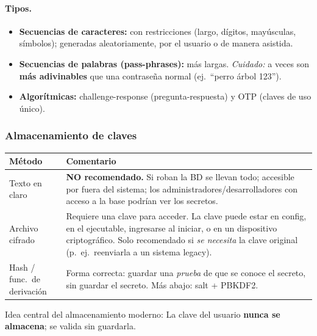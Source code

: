 \documentclass[../main.tex]{subfiles}
\begin{document}
\paragraph{Tipos.}
\begin{itemize}[itemsep=1pt]
  \item \textbf{Secuencias de caracteres:} con restricciones (largo, dígitos, mayúsculas, símbolos); generadas aleatoriamente, por el usuario o de manera asistida.
  \item \textbf{Secuencias de palabras (pass-phrases):} más largas. \emph{Cuidado:} a veces son \textbf{más adivinables} que una contraseña normal (ej.\ ``perro árbol 123'').
  \item \textbf{Algorítmicas:} challenge-response (pregunta-respuesta) y OTP (claves de uso único).
\end{itemize}

\subsubsection{Almacenamiento de claves}

\begin{center}
\begin{tabular}{l p{9.5cm}}
\toprule
\textbf{Método} & \textbf{Comentario} \\
\midrule
Texto en claro & \textbf{NO recomendado.} Si roban la BD se llevan todo; accesible por fuera del sistema; los administradores/desarrolladores con acceso a la base podrían ver los secretos. \\
Archivo cifrado & Requiere una clave para acceder. La clave puede estar en config, en el ejecutable, ingresarse al iniciar, o en un dispositivo criptográfico. Solo recomendado si \emph{se necesita} la clave original (p.\ ej.\ reenviarla a un sistema legacy). \\
Hash / func.\ de derivación & Forma correcta: guardar una \emph{prueba} de que se conoce el secreto, sin guardar el secreto. Más abajo: salt + PBKDF2. \\
\bottomrule
\end{tabular}
\end{center}

\begin{destacado}
Idea central del almacenamiento moderno: 
La clave del usuario \textbf{nunca se almacena}; se valida sin guardarla.
\end{destacado}
\end{document}
